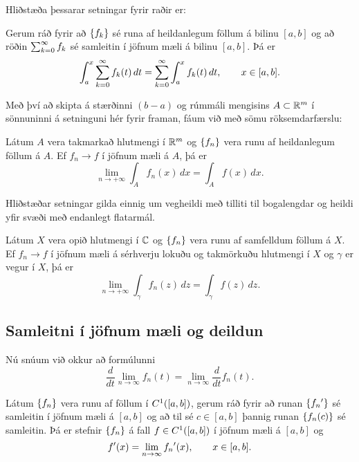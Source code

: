 \medskip
Hliðstæða þessarar setningar fyrir raðir er:


\begin{fs} 
Gerum ráð fyrir að   ${\{f_k\}}$ sé runa af heildanlegum föllum
 á bilinu $[a,b]$  og
að röðin  $\sum_{k=0}\sp \infty f_k$ sé samleitin
í jöfnum mæli á bilinu $[a,b]$.  Þá er
 $$\int_a\sp x \sum_{k=0}\sp \infty f_k(t)\, dt
= \sum_{k=0}\sp \infty \int_a\sp x  f_k(t)\, dt, \qquad x\in [a,b].
 $$
\end{fs}


Með því að skipta á stærðinni $(b-a)$ og rúmmáli mengisins $A\subset
{\mathbb R}\sp m$ í sönnuninni á setninguni hér fyrir framan, fáum við með sömu
röksemdarfærslu: 

\begin{se}  Látum $A$ vera takmarkað hlutmengi í
${\mathbb R}\sp m$ og ${\{f_n\}}$ vera runu af heildanlegum föllum á $A$.  Ef
$f_n\to f$ í jöfnum mæli á $A$, þá er 
 $$\lim\limits_{n\to +\infty} \int_A f_n(x)\, dx = \int_Af(x)\, dx.
 $$
\end{se}


Hliðstæðar setningar gilda einnig um vegheildi með tilliti til
bogalengdar og heildi yfir svæði með endanlegt flatarmál.

\begin{se}  Látum $X$ vera opið hlutmengi í
${\mathbb C}$ og ${\{f_n\}}$ vera runu af samfelldum föllum á $X$.  Ef
$f_n\to f$ í jöfnum mæli á sérhverju lokuðu og takmörkuðu hlutmengi í 
$X$ og $\gamma$ er vegur í 
$X$,  þá er 
 $$\lim\limits_{n\to +\infty} \int_\gamma f_n(z)\, dz = 
\int_\gamma f(z)\, dz.
 $$
\end{se}



\subsection*{Samleitni í jöfnum mæli og deildun}

Nú snúum við okkur að formúlunni
\begin{equation*}
\dfrac d{dt} \lim_{n\to \infty} f_n(t) =\lim_{n\to\infty}
\dfrac d{dt} f_n(t).\label{B.4.1}
\end{equation*}

\begin{se}
Látum ${\{f_n\}}$ vera runu af föllum í  $C\sp 1([a,b])$,
 gerum ráð fyrir að runan ${\{f_n{\sp{\prime}}\}}$ sé  samleitin í jöfnum mæli á
$[a,b]$ og að til sé $c\in [a,b]$ þannig runan ${\{f_n(c)\}}$ sé samleitin.
Þá er stefnir ${\{f_n\}}$ á fall $f\in C\sp 1([a,b])$ í jöfnum mæli á
$[a,b]$ og 
 $$f{\sp{\prime}}(x)=\lim_{n\to \infty}f_n{\sp{\prime}}(x), \qquad x\in [a,b].
 $$
\end{se}


